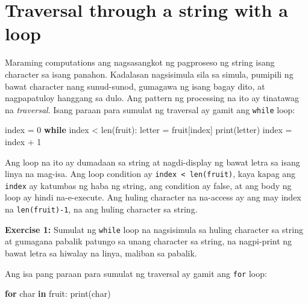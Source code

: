 \documentclass[10pt,]{book}
\newenvironment{Shaded}{}{}
\newcommand{\BuiltInTok}[1]{\textcolor[rgb]{0.00,0.50,0.00}{#1}}
\newcommand{\ControlFlowTok}[1]{\textcolor[rgb]{0.00,0.44,0.13}{\textbf{#1}}}
\newcommand{\DecValTok}[1]{\textcolor[rgb]{0.25,0.63,0.44}{#1}}
\newcommand{\KeywordTok}[1]{\textcolor[rgb]{0.00,0.44,0.13}{\textbf{#1}}}
\newcommand{\NormalTok}[1]{#1}
\newcommand{\OperatorTok}[1]{\textcolor[rgb]{0.40,0.40,0.40}{#1}}
\begin{document}
 

\section{Traversal through a string with a
loop}\label{traversal-through-a-string-with-a-loop}

  
  

Maraming computations ang nagsasangkot ng pagproseso ng string isang
character sa isang panahon. Kadalasan nagsisimula sila sa simula,
pumipili ng bawat character nang sunud-sunod, gumagawa ng isang bagay
dito, at nagpapatuloy hanggang sa dulo. Ang pattern ng processing na ito
ay tinatawag na \emph{traversal}. Isang paraan para sumulat ng traversal
ay gamit ang \texttt{while} loop:

\begin{Shaded}
\begin{Highlighting}[]
\NormalTok{index }\OperatorTok{=} \DecValTok{0}
\ControlFlowTok{while}\NormalTok{ index }\OperatorTok{\textless{}} \BuiltInTok{len}\NormalTok{(fruit):}
\NormalTok{    letter }\OperatorTok{=}\NormalTok{ fruit[index]}
    \BuiltInTok{print}\NormalTok{(letter)}
\NormalTok{    index }\OperatorTok{=}\NormalTok{ index }\OperatorTok{+} \DecValTok{1}
\end{Highlighting}
\end{Shaded}

Ang loop na ito ay dumadaan sa string at nagdi-display ng bawat letra sa
isang linya na mag-isa. Ang loop condition ay
\texttt{index\ \textless{}\ len(fruit)}, kaya kapag ang \texttt{index}
ay katumbas ng haba ng string, ang condition ay false, at ang body ng
loop ay hindi na-e-execute. Ang huling character na na-access ay ang may
index na \texttt{len(fruit)-1}, na ang huling character sa string.

\textbf{Exercise 1:} Sumulat ng \texttt{while} loop na nagsisimula sa
huling character sa string at gumagana pabalik patungo sa unang
character sa string, na nagpi-print ng bawat letra sa hiwalay na linya,
maliban sa pabalik.

Ang isa pang paraan para sumulat ng traversal ay gamit ang \texttt{for}
loop:

\begin{Shaded}
\begin{Highlighting}[]
\ControlFlowTok{for}\NormalTok{ char }\KeywordTok{in}\NormalTok{ fruit:}
    \BuiltInTok{print}\NormalTok{(char)}
\end{Highlighting}
\end{Shaded}
\end{document}
